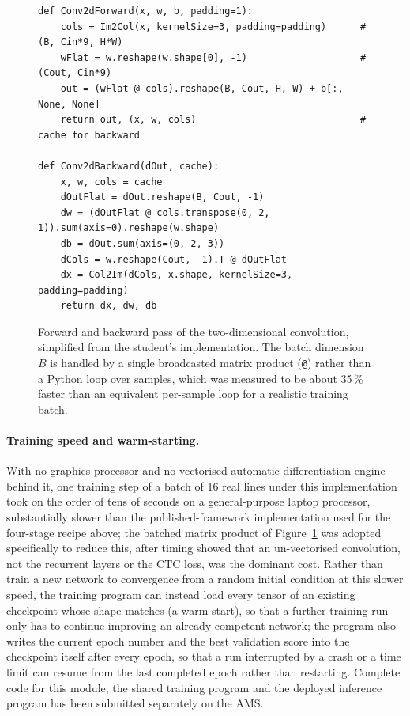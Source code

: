 \begin{figure}[h]
\centering
\fontsize{8.5}{10}\selectfont
\begin{verbatim}
def Conv2dForward(x, w, b, padding=1):
    cols = Im2Col(x, kernelSize=3, padding=padding)      # (B, Cin*9, H*W)
    wFlat = w.reshape(w.shape[0], -1)                    # (Cout, Cin*9)
    out = (wFlat @ cols).reshape(B, Cout, H, W) + b[:, None, None]
    return out, (x, w, cols)                             # cache for backward

def Conv2dBackward(dOut, cache):
    x, w, cols = cache
    dOutFlat = dOut.reshape(B, Cout, -1)
    dw = (dOutFlat @ cols.transpose(0, 2, 1)).sum(axis=0).reshape(w.shape)
    db = dOut.sum(axis=(0, 2, 3))
    dCols = w.reshape(Cout, -1).T @ dOutFlat
    dx = Col2Im(dCols, x.shape, kernelSize=3, padding=padding)
    return dx, dw, db
\end{verbatim}
\caption{Forward and backward pass of the two-dimensional convolution, simplified from the student's implementation. The batch dimension $B$ is handled by a single broadcasted matrix product (\texttt{@}) rather than a Python loop over samples, which was measured to be about 35\,\% faster than an equivalent per-sample loop for a realistic training batch.}
\label{fig:rec-conv2d}
\end{figure}

\paragraph{Training speed and warm-starting.}
With no graphics processor and no vectorised automatic-differentiation engine behind it, one training step of a batch of 16 real lines under this implementation took on the order of tens of seconds on a general-purpose laptop processor, substantially slower than the published-framework implementation used for the four-stage recipe above; the batched matrix product of Figure~\ref{fig:rec-conv2d} was adopted specifically to reduce this, after timing showed that an un-vectorised convolution, not the recurrent layers or the CTC loss, was the dominant cost.
Rather than train a new network to convergence from a random initial condition at this slower speed, the training program can instead load every tensor of an existing checkpoint whose shape matches (a warm start), so that a further training run only has to continue improving an already-competent network; the program also writes the current epoch number and the best validation score into the checkpoint itself after every epoch, so that a run interrupted by a crash or a time limit can resume from the last completed epoch rather than restarting.
Complete code for this module, the shared training program and the deployed inference program has been submitted separately on the AMS.


